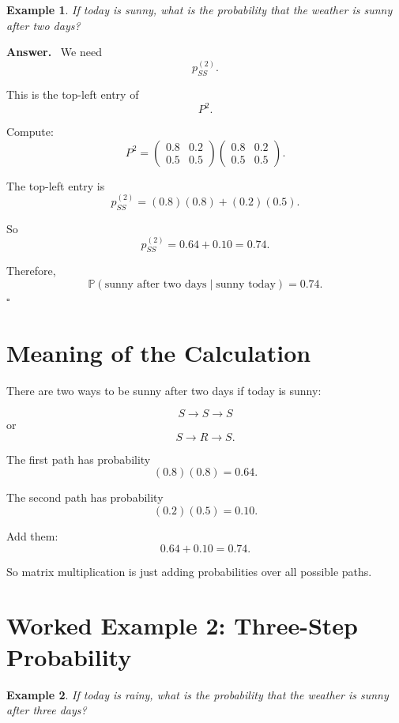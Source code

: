 \documentclass[12pt,a4paper]{article}
\theoremstyle{notestyle}
\newtheorem{example}{Example}
\newenvironment{answer}
{\par\textbf{Answer.}\ }
{\hfill$\square$\par}
\newcommand{\Prob}{\mathbb{P}}
\begin{document}
\begin{example}
If today is sunny, what is the probability that the weather is sunny after two days?
\end{example}

\begin{answer}
We need
\[
p_{SS}^{(2)}.
\]

This is the top-left entry of
\[
P^2.
\]

Compute:
\[
P^2=
\begin{pmatrix}
0.8 & 0.2\\
0.5 & 0.5
\end{pmatrix}
\begin{pmatrix}
0.8 & 0.2\\
0.5 & 0.5
\end{pmatrix}.
\]

The top-left entry is
\[
p_{SS}^{(2)}
=
(0.8)(0.8)+(0.2)(0.5).
\]

So
\[
p_{SS}^{(2)}
=
0.64+0.10
=
0.74.
\]

Therefore,
\[
\boxed{\Prob(\text{sunny after two days}\mid \text{sunny today})=0.74.}
\]
\end{answer}

\section{Meaning of the Calculation}

There are two ways to be sunny after two days if today is sunny:

\[
S\to S\to S
\]
or
\[
S\to R\to S.
\]

The first path has probability
\[
(0.8)(0.8)=0.64.
\]

The second path has probability
\[
(0.2)(0.5)=0.10.
\]

Add them:
\[
0.64+0.10=0.74.
\]

So matrix multiplication is just adding probabilities over all possible paths.

\section{Worked Example 2: Three-Step Probability}

\begin{example}
If today is rainy, what is the probability that the weather is sunny after three days?
\end{example}
\end{document}
